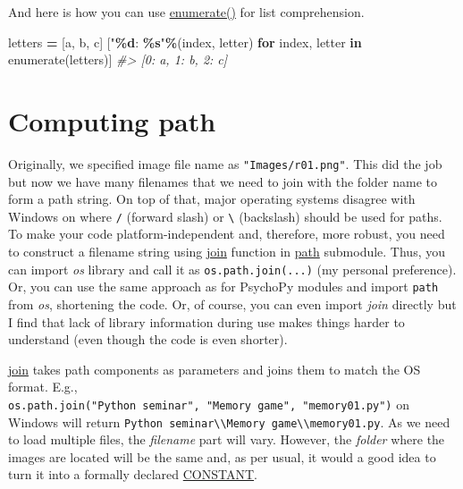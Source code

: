 \documentclass[
]{book}
\newenvironment{Shaded}{\begin{snugshade}}{\end{snugshade}}
\newcommand{\BuiltInTok}[1]{#1}
\newcommand{\CommentTok}[1]{\textcolor[rgb]{0.56,0.35,0.01}{\textit{#1}}}
\newcommand{\ControlFlowTok}[1]{\textcolor[rgb]{0.13,0.29,0.53}{\textbf{#1}}}
\newcommand{\KeywordTok}[1]{\textcolor[rgb]{0.13,0.29,0.53}{\textbf{#1}}}
\newcommand{\NormalTok}[1]{#1}
\newcommand{\OperatorTok}[1]{\textcolor[rgb]{0.81,0.36,0.00}{\textbf{#1}}}
\newcommand{\SpecialCharTok}[1]{\textcolor[rgb]{0.81,0.36,0.00}{\textbf{#1}}}
\newcommand{\StringTok}[1]{\textcolor[rgb]{0.31,0.60,0.02}{#1}}
\begin{document}
And here is how you can use \href{https://docs.python.org/3/library/functions.html\#enumerate}{enumerate()} for list comprehension.

\begin{Shaded}
\begin{Highlighting}[]
\NormalTok{letters }\OperatorTok{=}\NormalTok{ [}\StringTok{\textquotesingle{}a\textquotesingle{}}\NormalTok{, }\StringTok{\textquotesingle{}b\textquotesingle{}}\NormalTok{, }\StringTok{\textquotesingle{}c\textquotesingle{}}\NormalTok{]}
\NormalTok{[}\StringTok{"}\SpecialCharTok{\%d}\StringTok{: }\SpecialCharTok{\%s}\StringTok{"}\OperatorTok{\%}\NormalTok{(index, letter) }\ControlFlowTok{for}\NormalTok{ index, letter }\KeywordTok{in} \BuiltInTok{enumerate}\NormalTok{(letters)]}
\CommentTok{\#\textgreater{} [\textquotesingle{}0: a\textquotesingle{}, \textquotesingle{}1: b\textquotesingle{}, \textquotesingle{}2: c\textquotesingle{}]}
\end{Highlighting}
\end{Shaded}

\hypertarget{os-library}{%
\section{Computing path}\label{os-library}}

Originally, we specified image file name as \texttt{"Images/r01.png"}. This did the job but now we have many filenames that we need to join with the folder name to form a path string. On top of that, major operating systems disagree with Windows on where \texttt{/} (forward slash) or \texttt{\textbackslash{}} (backslash) should be used for paths. To make your code platform-independent and, therefore, more robust, you need to construct a filename string using \href{https://docs.python.org/3/library/os.path.html\#os.path.join}{join} function in \href{https://docs.python.org/3/library/os.path.html}{path} submodule. Thus, you can import \emph{os} library and call it as \texttt{os.path.join(...)} (my personal preference). Or, you can use the same approach as for PsychoPy modules and import \texttt{path} from \emph{os}, shortening the code. Or, of course, you can even import \emph{join} directly but I find that lack of library information during use makes things harder to understand (even though the code is even shorter).

\href{https://docs.python.org/3/library/os.path.html\#os.path.join}{join} takes path components as parameters and joins them to match the OS format. E.g., \texttt{os.path.join("Python\ seminar",\ "Memory\ game",\ "memory01.py")} on Windows will return \texttt{\textquotesingle{}Python\ seminar\textbackslash{}\textbackslash{}Memory\ game\textbackslash{}\textbackslash{}memory01.py\textquotesingle{}}. As we need to load multiple files, the \emph{filename} part will vary. However, the \emph{folder} where the images are located will be the same and, as per usual, it would a good idea to turn it into a formally declared \protect\hyperlink{constants}{CONSTANT}.
\end{document}
